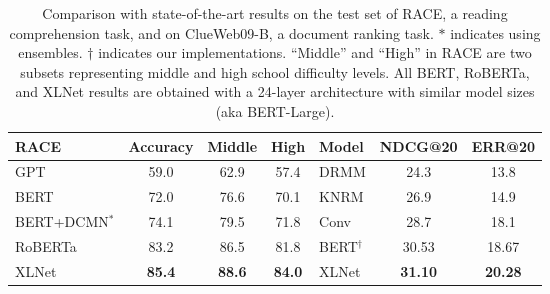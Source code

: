 \documentclass{article}
\begin{document}
\begin{table}[!h]
	\small
	\centering
	\begin{tabular}{lccc|lcc}
		\toprule
		\bf RACE & \bf Accuracy & \bf Middle & \bf High & \bf Model & \bf NDCG@20 & \bf ERR@20 \\
		\midrule
		GPT \cite{radford2018improving} & 59.0 & 62.9 & 57.4 & DRMM \cite{guo2016deep} & 24.3 & 13.8 \\
		BERT \cite{pan2019improving} & 72.0 & 76.6 & 70.1 & KNRM \cite{dai2018convolutional} & 26.9 & 14.9 \\
BERT+DCMN$^*$ \cite{zhang2019dual} & 74.1 & 79.5 & 71.8 & Conv \cite{dai2018convolutional} & 28.7 & 18.1 \\
		RoBERTa \cite{liu2019roberta} & 83.2 & 86.5 & 81.8 & BERT$^\dagger$ & 30.53 & 18.67 \\
		\midrule
		XLNet & \bf 85.4 & \bf 88.6 & \bf 84.0 & XLNet & \bf 31.10 & \bf 20.28 \\
		\bottomrule
	\end{tabular}
	\caption{\small
		Comparison with state-of-the-art results on the test set of RACE, a reading comprehension task, and on ClueWeb09-B, a document ranking task. $*$ indicates using ensembles. $\dagger$ indicates our implementations. ``Middle'' and ``High'' in RACE are two subsets representing middle and high school difficulty levels. All BERT, RoBERTa, and XLNet results are obtained with a 24-layer architecture with similar model sizes (aka BERT-Large).
	}
	\label{tab:race}
\end{table}
\end{document}
